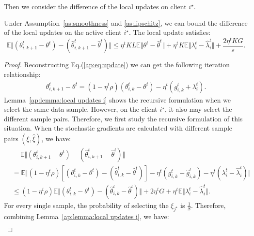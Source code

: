 Then we consider the difference of the local updates on client $i^\star$.
\begin{lemma}
\label{ap:lemma:local updates istar}
    Under Assumption~\ref{as:smoothness} and \ref{as:lipschitz}, we can bound the difference of the local updates on the active client $i^\star$. The local update satisfies:
    \begin{equation}
        \mathbb{E}\Vert\left(\theta_{i,k+1}^t - \theta^t \right) - \left(\hat{\theta}_{i,k+1}^t - \hat{\theta}^t \right)\Vert \leq \eta^t KL\mathbb{E}\Vert \theta^t - \hat{\theta}^t \Vert + \eta^t K\mathbb{E}\Vert \lambda_i^t - \hat{\lambda}_i^t\Vert + \frac{2\eta^t KG}{s}.
    \end{equation}
\end{lemma}
\begin{proof}
    Reconstructing Eq.(\ref{ap:eq:update}) we can get the following iteration relationship:
    \begin{align*}
        \theta_{i,k+1}^t - \theta^t = \left(1-\eta^t\rho\right)\left(\theta_{i,k}^t - \theta^t\right) - \eta^t \left(g_{i,k}^t + \lambda_i^t\right).
    \end{align*}
    Lemma~\ref{ap:lemma:local updates i} shows the recursive formulation when we select the same data sample. However, on the client $i^\star$, it also may select the different sample pairs. Therefore, we first study the recursive formulation of this situation. When the stochastic gradients are calculated with different sample pairs $(\xi, \hat{\xi})$, we have:
    \begin{align*}
        &\quad \ \mathbb{E}\Vert\left(\theta_{i,k+1}^t - \theta^t \right) - \left(\hat{\theta}_{i,k+1}^t - \hat{\theta}^t \right)\Vert\\
        &= \mathbb{E}\Vert\left(1-\eta^t\rho\right)\left[\left(\theta_{i,k}^t - \theta^t \right) - \left(\hat{\theta}_{i,k}^t - \hat{\theta}^t \right)\right] - \eta^t\left(g_{i,k}^t - \hat{g}_{i,k}^t\right)- \eta^t\left(\lambda_i^t - \hat{\lambda}_i^t\right)\Vert\\
        &\leq \left(1-\eta^t\rho\right)\mathbb{E}\Vert\left(\theta_{i,k}^t - \theta^t\right) - \left(\hat{\theta}_{i,k}^t - \hat{\theta}^t \right)\Vert + 2\eta^t G + \eta^t\mathbb{E}\Vert \lambda_i^t - \hat{\lambda}_i^t\Vert.
    \end{align*}
    For every single sample, the probability of selecting the $\xi_{j^\star}$ is $\frac{1}{S}$. Therefore, combining Lemma~\ref{ap:lemma:local updates i}, we have:
    \begin{align*}

\end{align*}
\end{proof}
